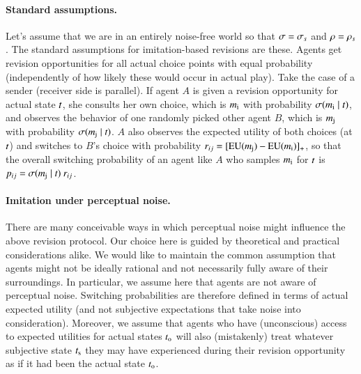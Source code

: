 \documentclass[fleqn,reqno,10pt]{article}
\begin{document}
\paragraph{Standard assumptions.} Let's assume that we are in an
entirely noise-free world so that $\sigma = \sigma_s$ and $\rho =
\rho_s$. The standard assumptions for imitation-based revisions are
these. Agents get revision opportunities for all actual choice points
with equal probability (independently of how likely these would occur
in actual play). Take the case of a sender (receiver side is
parallel). If agent $A$ is given a revision opportunity for actual
state $t$, she consults her own choice, which is $m_{\mathrm{i}}$
with probability $\sigma(m_{\mathrm{i}} \mid t)$, and observes
the behavior of one randomly picked other agent $B$, which is
$m_{\mathrm{j}}$ with probability $\sigma(m_{\mathrm{j}} \mid
t)$. $A$ also observes the expected utility of both choices (at
$t$) and switches to $B$'s choice with probability $r_{ij} = [
\mathrm{EU}(m_{\mathrm{j}}) - \mathrm{EU}(m_{\mathrm{i}}) ]_+$, so that the overall
switching probability of an agent like $A$ who samples $m_{\mathrm{i}}$
for $t$ is $p_{ij} = \sigma(m_{\mathrm{j}} \mid t) \
r_{ij}$.

\paragraph{Imitation under perceptual noise.} There are many conceivable ways in which
perceptual noise might influence the above revision protocol. Our choice here is guided by
theoretical and practical considerations alike. We would like to maintain the common assumption
that agents might not be ideally rational and not necessarily fully aware of their
surroundings. In particular, we assume here that agents are not aware of perceptual
noise. Switching probabilities are therefore defined in terms of actual expected utility (and
not subjective expectations that take noise into consideration). Moreover, we assume that
agents who have (unconscious) access to expected utilities for actual states $t_{\mathrm{o}}$ will
also (mistakenly) treat whatever subjective state $t_{\mathrm{s}}$ they may have experienced
during their revision opportunity as if it had been the actual state $t_{\mathrm{o}}$.
\end{document}

